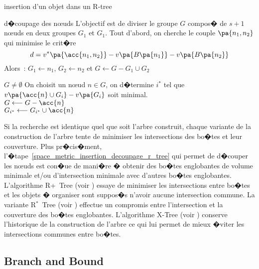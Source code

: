 \begin{xalgorithm}{insertion d'un objet dans un R-tree}
        \begin{xalgostep}{d�coupage des n\oe uds} \label{space_metric_insertion_decoupage_r_tree}
        L'objectif est de diviser le groupe $G$ compos� de $s+1$ n\oe uds en deux groupes $G_1$ et $G_1$. 
        Tout d'abord, on cherche 
        le couple $\pa{n_1,n_2}$ qui minimise le crit�re $$ d = v^*\pa{\acc{n_1,n_2}} - v\pa{B\pa{n_1}} - v\pa{B\pa{n_2}}$$ Alors~:
        $G_1 \longleftarrow n_1$, $G_2 \longleftarrow n_2$ et $G \longleftarrow G - G_1 \cup G_2$ \\
        \begin{xwhile}{$G \neq \emptyset$}
                On choisit un n\oe ud $n \in G$, on d�termine $i^*$ tel que $v\pa{\acc{n} \cup G_i} - v\pa{G_i}$ soit minimal. \\
                $G \longleftarrow G - \acc{n}$ \\
                $G_{i^*} \longleftarrow G_{i^*} \cup \acc{n}$
        \end{xwhile}
        \end{xalgostep}


        \end{xalgorithm}








Si la recherche est identique quel que soit l'arbre construit, chaque variante de la construction de l'arbre tente de minimiser les intersections des bo�tes et leur couverture. Plus pr�cis�ment, l'�tape~\ref{space_metric_insertion_decoupage_r_tree} qui permet de d�couper les n\oe uds est con�ue de mani�re � obtenir des bo�tes englobantes de volume minimale et/ou d'intersection minimale avec d'autres bo�tes englobantes. L'algorithme R+~Tree (voir ) essaye de minimiser les intersections entre bo�tes et les objets � organiser sont suppos�s n'avoir aucune intersection commune. La variante R$^*$~Tree (voir ) effectue un compromis entre l'intersection et la couverture des bo�tes englobantes. L'algorithme X-Tree (voir ) conserve l'historique de la construction de l'arbre ce qui lui permet de mieux �viter les intersections communes entre bo�tes.









\subsection{Branch and Bound}

